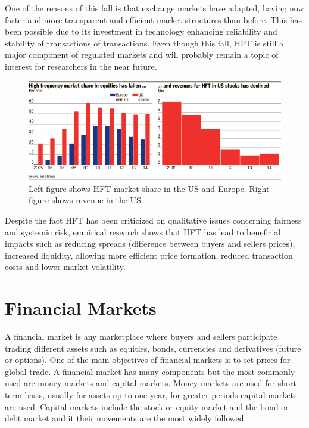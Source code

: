 One of the reasons of this fall is that exchange markets have adapted, having
now faster and more transparent and efficient market structures than before.
This has been possible due to its investment in technology enhancing
reliability and stability of transactions of transactions.
Even though this fall, HFT is still a major component of regulated markets and
will probably remain a topic of interest for researchers in the near future.


\begin{figure}[!h]
  \centering
  \includegraphics[width=\textwidth]{img/HFTmarket}
  \caption{Left figure shows HFT market share in the US and Europe. Right figure
  shows revenue in the US.}
  \label{fig:HFTmarket}
\end{figure}

Despite the fact HFT has been criticized on qualitative issues concerning
fairness and systemic risk, empirical research shows that HFT has lead to
beneficial impacts such as reducing spreads (difference between buyers and
sellers prices), increased liquidity, allowing more efficient price formation,
reduced transaction costs and lower market volatility.


\section{Financial Markets}

A financial market is any marketplace where buyers and sellers participate
trading different assets such as equities, bonds, currencies and derivatives
(future or options). One of the main objectives of financial markets is to set
prices for global trade.
A financial market has many components but the most commonly used are money
markets and capital markets. Money markets are used for short-term basis,
usually for assets up to one year, for greater periods capital markets are used.
Capital markets include the stock or equity market and the bond or debt market
and it their movements are the most widely followed.



